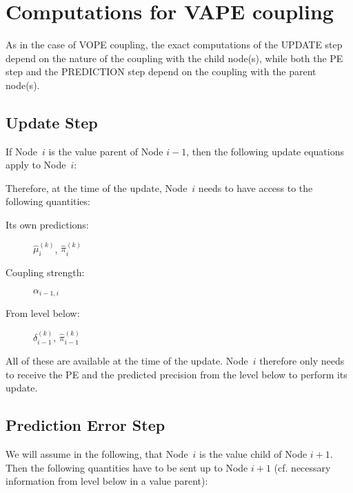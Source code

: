\section{Computations for VAPE coupling}
As in the case of \textsf{VOPE} coupling, the exact computations of the \textsf{UPDATE step} depend on the nature of the coupling with the child node(s), while both the \textsf{PE step} and the \textsf{PREDICTION step} depend on the coupling with the parent node(s).

\subsection{Update Step}
If Node~$i$ is the value parent of Node $i-1$, then the following update equations apply to Node~$i$:
\vspace{0.5cm}

\noindent
{}%
\vspace{0.5cm}

\noindent
Therefore, at the time of the update, Node~$i$ needs to have access to the following quantities:

\begin{description}
\item[Its own predictions:]  	$\hat{\mu}_i^{(k)}$, $\hat{\pi}_i^{(k)}$
\item[Coupling strength:] 		$\alpha_{i-1,i}$
\item[From level below:]		$\delta_{i-1}^{(k)}$, $\hat{\pi}_{i-1}^{(k)}$
\end{description}

All of these are available at the time of the update. Node~$i$ therefore only needs to receive the PE and the predicted precision from the level below to perform its update.

\subsection{Prediction Error Step}
We will assume in the following, that Node~$i$ is the value child of Node $i+1$. Then the following quantities have to be sent up to Node $i+1$ (cf. necessary information from level below in a value parent):

